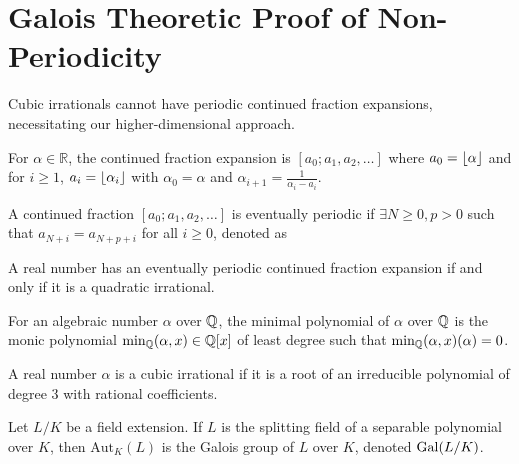\section{Galois Theoretic Proof of Non-Periodicity}\label{sec:galois_theory}

Cubic irrationals cannot have periodic continued fraction expansions, necessitating our higher-dimensional approach.

\begin{definition}
For $\alpha \in \mathbb{R}$, the continued fraction expansion is $[a_0; a_1, a_2, \ldots]$ where $a_0 = \lfloor \alpha \rfloor$ and for $i \geq 1$, $a_i = \lfloor \alpha_i \rfloor$ with $\alpha_0 = \alpha$ and $\alpha_{i+1} = \frac{1}{\alpha_i - a_i}$.
\end{definition}

\begin{definition}
A continued fraction $[a_0; a_1, a_2, \ldots]$ is eventually periodic if $\exists N \geq 0, p > 0$ such that $a_{N+i} = a_{N+p+i}$ for all $i \geq 0$, denoted as 
\begin{equation}
[a_0; a_1, \ldots, a_{N-1}, \overline{a_N, \ldots, a_{N+p-1}}]
\end{equation}
\end{definition}

\begin{theorem}\label{thm:lagrange}
A real number has an eventually periodic continued fraction expansion if and only if it is a quadratic irrational.
\end{theorem}

\begin{definition}
For an algebraic number $\alpha$ over $\mathbb{Q}$, the minimal polynomial of $\alpha$ over $\mathbb{Q}$ is the monic polynomial $\text{min}_{\mathbb{Q}}(\alpha, x) \in \mathbb{Q}[x]$ of least degree such that $\text{min}_{\mathbb{Q}}(\alpha, x)(\alpha) = 0$.
\end{definition}

\begin{definition}
A real number $\alpha$ is a cubic irrational if it is a root of an irreducible polynomial of degree 3 with rational coefficients.
\end{definition}

\begin{definition}
Let $L/K$ be a field extension. If $L$ is the splitting field of a 
separable polynomial over $K$, then $\text{Aut}_K(L)$ is the Galois group 
of $L$ over $K$, denoted $\operatorname{Gal}(L/K)$.
\end{definition}

